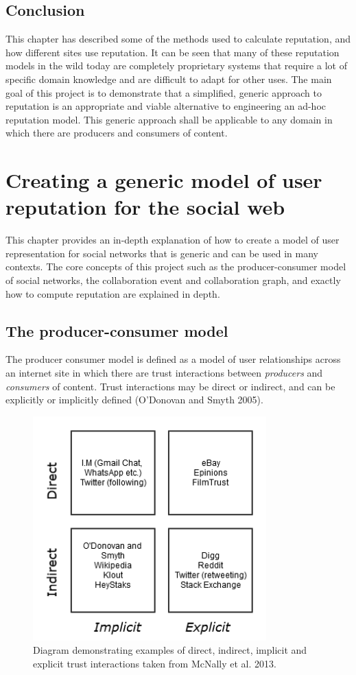 \documentclass[]{final_report}
\begin{document}
\section{Conclusion}

This chapter has described some of the methods used to calculate reputation, and how different sites use reputation. It can be seen that many of these reputation models in the wild today are completely proprietary systems that require a lot of specific domain knowledge and are difficult to adapt for other uses. The main goal of this project is to demonstrate that a simplified, generic approach to reputation is an appropriate and viable alternative to engineering an ad-hoc reputation model. This generic approach shall be applicable to any domain in which there are producers and consumers of content.

\chapter{Creating a generic model of user reputation for the social web}
This chapter provides an in-depth explanation of how to create a model of user representation for social networks that is generic and can be used in many contexts. The core concepts of this project such as the producer-consumer model of social networks, the collaboration event and collaboration graph, and exactly how to compute reputation are explained in depth.

\section{The producer-consumer model}

The producer consumer model is defined as a model of user relationships across an internet site in which there are trust interactions between \textsl{producers} and \textsl{consumers} of content. Trust interactions may be direct or indirect, and can be explicitly or implicitly defined (O'Donovan and Smyth 2005).

\begin{figure}[ht!]
\centering
\includegraphics[width=90mm]{chap3/trusttypes.png}
\caption{Diagram demonstrating examples of direct, indirect, implicit and explicit trust interactions taken from McNally et al. 2013.}
\end{figure}\label{gra:trusttypes}
\end{document}

